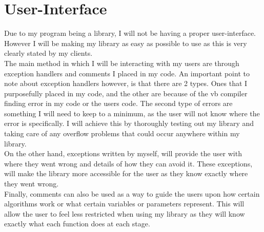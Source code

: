 \section{User-Interface}
Due to my program being a library, I will not be having a proper user-interface. However I will be making my library as easy as possible to use as this is very clearly stated by my clients.
\\
The main method in which I will be interacting with my users are through exception handlers and comments I placed in my code. An important point to note about exception handlers however, is that there are 2 types. Ones that I purposefully placed in my code, and the other are because of the vb compiler finding error in my code or the users code. The second type of errors are something I will need to keep to a minimum, as the user will not know where the error is specifically. I will achieve this by thoroughly testing out my library and taking care of any overflow problems that could occur anywhere within my library. \\
On the other hand, exceptions written by myself, will provide the user with where they went wrong and details of how they can avoid it. These exceptions, will make the library more accessible for the user as they know exactly where they went wrong. \\
Finally, comments can also be used as a way to guide the users upon how certain algorithms work or what certain variables or parameters represent. This will allow the user to feel less restricted when using my library as they will know exactly what each function does at each stage.